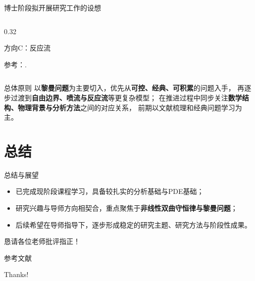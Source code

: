 \documentclass{beamer}
\begin{document}
\begin{frame}{博士阶段拟开展研究工作的设想}
\begin{columns}[T,totalwidth=\textwidth]
\begin{column}{0.32\textwidth}
\begin{block}{方向C：反应流}
\begin{minipage}[t]{\linewidth}
        \vspace{0.2em}
        {\scriptsize 参考：\cite{Smoller1994}.}
        \end{minipage}
        \end{block}
    \end{column}
\end{columns}

\vspace{0.1em}

\begin{alertblock}{总体原则}
\footnotesize
以\textbf{黎曼问题}为主要切入，优先从\textbf{可控、经典、可积累}的问题入手，
再逐步过渡到\textbf{自由边界、喷流与反应流}等更复杂模型；
在推进过程中同步关注\textbf{数学结构、物理背景与分析方法}之间的对应关系，
前期以文献梳理和经典问题学习为主。
\end{alertblock}

\end{frame}


















\section{总结}
\begin{frame}{总结与展望}
\begin{itemize}
    \item 已完成现阶段课程学习，具备较扎实的分析基础与PDE基础；
    \item 研究兴趣与导师方向相契合，重点聚焦于\textbf{非线性双曲守恒律与黎曼问题}；
    \item 后续希望在导师指导下，逐步形成稳定的研究主题、研究方法与阶段性成果。
\end{itemize}

\vspace{0.8em}
\begin{center}
{\Large 恳请各位老师批评指正！}
\end{center}
\end{frame}

\begin{frame}[allowframebreaks]{参考文献}
\printbibliography[heading=none]
\end{frame}



\begin{frame} 
    \begin{center} 
        {\Huge Thanks!} 
    \end{center} 
\end{frame}
\end{document}

